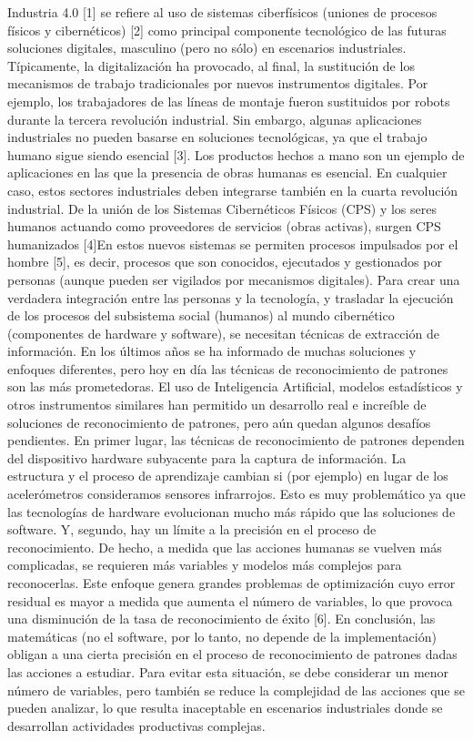 \documentclass[a4paper]{article}
\begin{document}
Industria 4.0 [1] se refiere al uso de sistemas ciberfísicos (uniones de procesos físicos y cibernéticos) [2] como principal componente tecnológico de las futuras soluciones digitales, masculino (pero no sólo) en escenarios industriales. Típicamente, la digitalización ha provocado, al final, la sustitución de los mecanismos de trabajo tradicionales por nuevos instrumentos digitales. Por ejemplo, los trabajadores de las líneas de montaje fueron sustituidos por robots durante la tercera revolución industrial.
Sin embargo, algunas aplicaciones industriales no pueden basarse en soluciones tecnológicas, ya que el trabajo humano sigue siendo esencial [3]. Los productos hechos a mano son un ejemplo de aplicaciones en las que la presencia de obras humanas es esencial. En cualquier caso, estos sectores industriales deben integrarse también en la cuarta revolución industrial. De la unión de los Sistemas Cibernéticos Físicos (CPS) y los seres humanos actuando como proveedores de servicios (obras activas), surgen CPS humanizados [4]En estos nuevos sistemas se permiten procesos impulsados por el hombre [5], es decir, procesos que son conocidos, ejecutados y gestionados por personas (aunque pueden ser vigilados por mecanismos digitales).
Para crear una verdadera integración entre las personas y la tecnología, y trasladar la ejecución de los procesos del subsistema social (humanos) al mundo cibernético (componentes de hardware y software), se necesitan técnicas de extracción de información. En los últimos años se ha informado de muchas soluciones y enfoques diferentes, pero hoy en día las técnicas de reconocimiento de patrones son las más prometedoras.
El uso de Inteligencia Artificial, modelos estadísticos y otros instrumentos similares han permitido un desarrollo real e increíble de soluciones de reconocimiento de patrones, pero aún quedan algunos desafíos pendientes.
En primer lugar, las técnicas de reconocimiento de patrones dependen del dispositivo hardware subyacente para la captura de información. La estructura y el proceso de aprendizaje cambian si (por ejemplo) en lugar de los acelerómetros consideramos sensores infrarrojos. Esto es muy problemático ya que las tecnologías de hardware evolucionan mucho más rápido que las soluciones de software.
Y, segundo, hay un límite a la precisión en el proceso de reconocimiento. De hecho, a medida que las acciones humanas se vuelven más complicadas, se requieren más variables y modelos más complejos para reconocerlas. Este enfoque genera grandes problemas de optimización cuyo error residual es mayor a medida que aumenta el número de variables, lo que provoca una disminución de la tasa de reconocimiento de éxito [6]. En conclusión, las matemáticas (no el software, por lo tanto, no depende de la implementación) obligan a una cierta precisión en el proceso de reconocimiento de patrones dadas las acciones a estudiar. Para evitar esta situación, se debe considerar un menor número de variables, pero también se reduce la complejidad de las acciones que se pueden analizar, lo que resulta inaceptable en escenarios industriales donde se desarrollan actividades productivas complejas.
\end{document}
